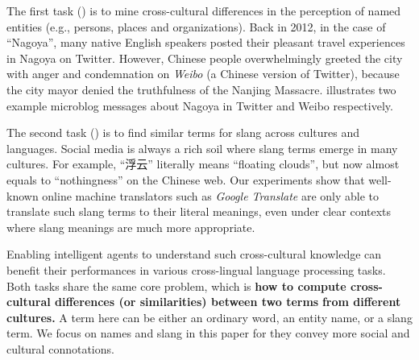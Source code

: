 The first task () is to mine cross-cultural differences in
the perception of named entities (e.g., persons, places and organizations). 
Back in 2012, in the case of ``Nagoya'', many native English speakers posted 
their pleasant travel experiences in Nagoya on Twitter.
However, Chinese people overwhelmingly greeted the city with anger and 
condemnation on \textit{Weibo} (a Chinese version of Twitter), because the city mayor denied the truthfulness of the Nanjing Massacre.
 illustrates two example microblog messages about Nagoya in Twitter and Weibo respectively.

The second task () is to find similar terms for slang across cultures and languages. 
Social media is always a rich soil where slang 
terms emerge in many cultures. 
For example, ``浮云'' literally means ``floating clouds'', 
but now almost equals to ``nothingness'' on the Chinese web.
Our experiments show that well-known online machine translators 
such as \textit{Google Translate} are only able to translate such 
slang terms to their literal meanings, 
even under clear contexts where slang meanings are much more appropriate.

Enabling intelligent agents to understand such cross-cultural knowledge 
can benefit their performances in various cross-lingual language processing 
tasks.  Both tasks share the same core problem, 
which is \textbf{how to compute cross-cultural differences 
(or similarities) between two terms}\textbf{ from 
different cultures.} {A term here can be either an ordinary word, 
an entity name, or a slang term. We focus on names and slang in this paper 
for they convey more social and cultural connotations.}

